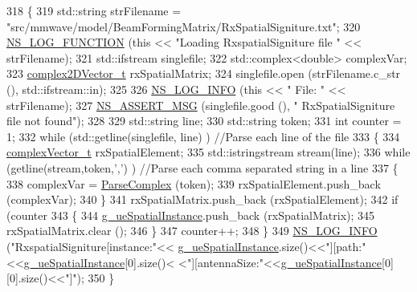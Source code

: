 \begin{DoxyCode}
318 \{
319         std::string strFilename = \textcolor{stringliteral}{"src/mmwave/model/BeamFormingMatrix/RxSpatialSigniture.txt"};
320         \hyperlink{log-macros-disabled_8h_a90b90d5bad1f39cb1b64923ea94c0761}{NS\_LOG\_FUNCTION} (\textcolor{keyword}{this} << \textcolor{stringliteral}{"Loading RxspatialSigniture file "} << strFilename);
321         std::ifstream singlefile;
322         std::complex<double> complexVar;
323         \hyperlink{namespacens3_aa25e3feece2676fd7470d50d4ba3d1d1}{complex2DVector\_t} rxSpatialMatrix;
324         singlefile.open (strFilename.c\_str (), std::ifstream::in);
325 
326         \hyperlink{group__logging_gafbd73ee2cf9f26b319f49086d8e860fb}{NS\_LOG\_INFO} (\textcolor{keyword}{this} << \textcolor{stringliteral}{" File: "} << strFilename);
327         \hyperlink{assert_8h_aff5ece9066c74e681e74999856f08539}{NS\_ASSERT\_MSG} (singlefile.good (), \textcolor{stringliteral}{" RxSpatialSigniture file not found"});
328 
329         std::string line;
330         std::string token;
331         \textcolor{keywordtype}{int} counter = 1;
332         \textcolor{keywordflow}{while} (std::getline(singlefile, line) ) \textcolor{comment}{//Parse each line of the file}
333         \{
334                  \hyperlink{namespacens3_a6a7f75817ae50e6ac47414955b17d926}{complexVector\_t} rxSpatialElement;
335              std::istringstream stream(line);
336              \textcolor{keywordflow}{while} (getline(stream,token,\textcolor{charliteral}{','}) ) \textcolor{comment}{//Parse each comma separated string in a line}
337              \{
338                  complexVar = \hyperlink{classns3_1_1MmWaveBeamforming_ac14df8250989c3400d482f974bf4104b}{ParseComplex} (token);
339                  rxSpatialElement.push\_back (complexVar);
340              \}
341              rxSpatialMatrix.push\_back (rxSpatialElement);
342              \textcolor{keywordflow}{if} (counter %
343              \{
344                          \hyperlink{namespacens3_a7979fdfb339164116e12d41020b221f7}{g\_ueSpatialInstance}.push\_back (rxSpatialMatrix);
345                          rxSpatialMatrix.clear ();
346                  \}
347              counter++;
348         \}
349         \hyperlink{group__logging_gafbd73ee2cf9f26b319f49086d8e860fb}{NS\_LOG\_INFO} (\textcolor{stringliteral}{"RxspatialSigniture[instance:"}<<
      \hyperlink{namespacens3_a7979fdfb339164116e12d41020b221f7}{g\_ueSpatialInstance}.size()<<\textcolor{stringliteral}{"][path:"}<<\hyperlink{namespacens3_a7979fdfb339164116e12d41020b221f7}{g\_ueSpatialInstance}[0].size()<
      <\textcolor{stringliteral}{"][antennaSize:"}<<\hyperlink{namespacens3_a7979fdfb339164116e12d41020b221f7}{g\_ueSpatialInstance}[0][0].size()<<\textcolor{stringliteral}{"]"});
350 \}
\end{DoxyCode}


